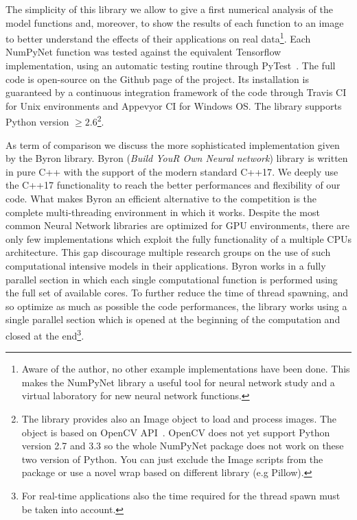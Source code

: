 \documentclass{standalone}
\begin{document}
The simplicity of this library we allow to give a first numerical analysis of the model functions and, moreover, to show the results of each function to an image to better understand the effects of their applications on real data\footnote{
  Aware of the author, no other example implementations have been done.
  This makes the \textsf{NumPyNet} library a useful tool for neural network study and a virtual laboratory for new neural network functions.
}.
Each \textsf{NumPyNet} function was tested against the equivalent \textsf{Tensorflow} implementation, using an automatic testing routine through \textsf{PyTest}~\cite{Okken:2017:PTP:3176124}.
The full code is open-source on the \textsf{Github} page of the project.
Its installation is guaranteed by a continuous integration framework of the code through \textsf{Travis CI} for Unix environments and \textsf{Appevyor CI} for Windows OS.
The library supports \textsf{Python} version $\ge2.6$\footnote{
  The library provides also an \textsf{Image} object to load and process images.
  The object is based on OpenCV API~\cite{OpenCV}.
  \textsf{OpenCV} does not yet support \textsf{Python} version 2.7 and 3.3 so the whole \textsf{NumPyNet} package does not work on these two version of \textsf{Python}.
  You can just exclude the \textsf{Image} scripts from the package or use a novel wrap based on different library (e.g \textsf{Pillow}).
}.

As term of comparison we discuss the more sophisticated implementation given by the \textsf{Byron} library.
\textsf{Byron} (\emph{Build YouR Own Neural network}) library is written in pure \textsf{C++} with the support of the modern standard \textsf{C++17}.
We deeply use the \textsf{C++17} functionality to reach the better performances and flexibility of our code.
What makes \textsf{Byron} an efficient alternative to the competition is the complete multi-threading environment in which it works.
Despite the most common Neural Network libraries are optimized for GPU environments, there are only few implementations which exploit the fully functionality of a multiple CPUs architecture.
This gap discourage multiple research groups on the use of such computational intensive models in their applications.
\textsf{Byron} works in a fully parallel section in which each single computational function is performed using the full set of available cores.
To further reduce the time of thread spawning, and so optimize as much as possible the code performances, the library works using a single parallel section which is opened at the beginning of the computation and closed at the end\footnote{
  For real-time applications also the time required for the thread spawn must be taken into account.
}.
\end{document}
